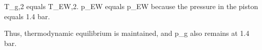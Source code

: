 T_g,2 equals T_EW,2.  
p_EW equals p_EW because the pressure in the piston equals 1.4 bar.  

Thus, thermodynamic equilibrium is maintained, and p_g also remains at 1.4 bar.